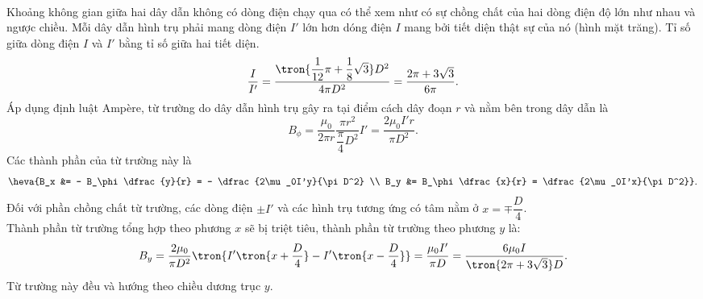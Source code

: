 \begin{loigiai}\\
Khoảng không gian giữa hai dây dẫn không có dòng điện chạy qua có thể xem như có sự chồng chất của hai dòng điện độ lớn như nhau và ngược chiều. Mỗi dây dẫn hình trụ phải mang dòng điện $I'$ lớn hơn dóng điện $I$ mang bởi tiết diện thật sự của nó (hình mặt trăng). Tỉ số  giữa dòng điện $I$ và $I'$ bằng tỉ số giữa hai tiết diện.
\[\dfrac{I}{I'} = \dfrac{\tron{\dfrac{1}{12}\pi + \dfrac{1}{8}\sqrt{3}}D^2}{4\pi D^2} = \dfrac{2\pi + 3\sqrt{3}}{6\pi}.\]
Áp dụng định luật Ampère, từ trường do dây dẫn hình trụ gây ra tại điểm cách dây đoạn $r$ và nằm bên trong dây dẫn là
\[B_\phi = \dfrac{\mu_0}{2\pi r} \dfrac{\pi r^2}{\dfrac{\pi}{4}D^2}I' = \dfrac{2\mu_0I'r}{\pi D^2}.\]
Các thành phần của từ trường này là
\[\heva{B_x &= - B_\phi \dfrac{y}{r} =  - \dfrac{2\mu_0I'y}{\pi D^2} \\ B_y &= B_\phi \dfrac{x}{r} = \dfrac{2\mu_0I'x}{\pi D^2}}.\]
Đối với phần chồng chất từ trường, các dòng điện $\pm I'$ và các hình trụ tương ứng có tâm nằm ở $x = \mp \dfrac{D}{4}$.\\
Thành phần từ trường tổng hợp theo phương $x$ sẽ bị triệt tiêu, thành phần từ trường theo phương $y$ là:
\[B_y = \dfrac{2\mu_0}{\pi D^2} \tron{I'\tron{x + \dfrac{D}{4}} - I'\tron{x - \dfrac{D}{4}}} = \dfrac{\mu_0I'}{\pi D} = \dfrac{6\mu_0I}{\tron{2\pi + 3\sqrt{3}}D}.\]
Từ trường này đều và hướng theo chiều dương trục $y$.
\end{loigiai}
